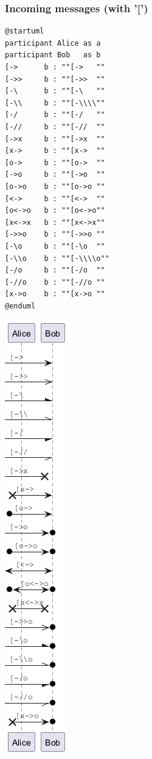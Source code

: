\subsubsection{Incoming messages (with '[')}
\begin{verbatim}
@startuml
participant Alice as a
participant Bob   as b
[->      b : ""[->   ""
[->>     b : ""[->>  ""
[-\      b : ""[-\   ""
[-\\     b : ""[-\\\\""
[-/      b : ""[-/   ""
[-//     b : ""[-//  ""
[->x     b : ""[->x  ""
[x->     b : ""[x->  ""
[o->     b : ""[o->  ""
[->o     b : ""[->o  ""
[o->o    b : ""[o->o ""
[<->     b : ""[<->  ""
[o<->o   b : ""[o<->o""
[x<->x   b : ""[x<->x""
[->>o    b : ""[->>o ""
[-\o     b : ""[-\o  ""
[-\\o    b : ""[-\\\\o""
[-/o     b : ""[-/o  ""
[-//o    b : ""[-//o ""
[x->o    b : ""[x->o ""
@enduml
\end{verbatim}
\begin{center}
\includegraphics[scale=0.60]{imgw/img-7caa8cc5c1a88bd5587a265356105cd8.png}
\end{center}


